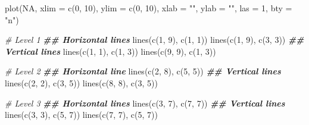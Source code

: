 \documentclass[
]{book}
\newenvironment{Shaded}{\begin{snugshade}}{\end{snugshade}}
\newcommand{\AttributeTok}[1]{\textcolor[rgb]{0.77,0.63,0.00}{#1}}
\newcommand{\CommentTok}[1]{\textcolor[rgb]{0.56,0.35,0.01}{\textit{#1}}}
\newcommand{\ConstantTok}[1]{\textcolor[rgb]{0.00,0.00,0.00}{#1}}
\newcommand{\DecValTok}[1]{\textcolor[rgb]{0.00,0.00,0.81}{#1}}
\newcommand{\DocumentationTok}[1]{\textcolor[rgb]{0.56,0.35,0.01}{\textbf{\textit{#1}}}}
\newcommand{\FunctionTok}[1]{\textcolor[rgb]{0.00,0.00,0.00}{#1}}
\newcommand{\NormalTok}[1]{#1}
\newcommand{\StringTok}[1]{\textcolor[rgb]{0.31,0.60,0.02}{#1}}
\begin{document}
\begin{Shaded}
\begin{Highlighting}[]
\FunctionTok{plot}\NormalTok{(}\ConstantTok{NA}\NormalTok{, }\AttributeTok{xlim =} \FunctionTok{c}\NormalTok{(}\DecValTok{0}\NormalTok{, }\DecValTok{10}\NormalTok{), }\AttributeTok{ylim =} \FunctionTok{c}\NormalTok{(}\DecValTok{0}\NormalTok{, }\DecValTok{10}\NormalTok{), }\AttributeTok{xlab =} \StringTok{""}\NormalTok{, }\AttributeTok{ylab =} \StringTok{""}\NormalTok{, }\AttributeTok{las =} \DecValTok{1}\NormalTok{, }\AttributeTok{bty =} \StringTok{"n"}\NormalTok{)}

\CommentTok{\# Level 1}
\DocumentationTok{\#\# Horizontal lines}
\FunctionTok{lines}\NormalTok{(}\FunctionTok{c}\NormalTok{(}\DecValTok{1}\NormalTok{, }\DecValTok{9}\NormalTok{), }\FunctionTok{c}\NormalTok{(}\DecValTok{1}\NormalTok{, }\DecValTok{1}\NormalTok{))}
\FunctionTok{lines}\NormalTok{(}\FunctionTok{c}\NormalTok{(}\DecValTok{1}\NormalTok{, }\DecValTok{9}\NormalTok{), }\FunctionTok{c}\NormalTok{(}\DecValTok{3}\NormalTok{, }\DecValTok{3}\NormalTok{))}
\DocumentationTok{\#\# Vertical lines}
\FunctionTok{lines}\NormalTok{(}\FunctionTok{c}\NormalTok{(}\DecValTok{1}\NormalTok{, }\DecValTok{1}\NormalTok{), }\FunctionTok{c}\NormalTok{(}\DecValTok{1}\NormalTok{, }\DecValTok{3}\NormalTok{))}
\FunctionTok{lines}\NormalTok{(}\FunctionTok{c}\NormalTok{(}\DecValTok{9}\NormalTok{, }\DecValTok{9}\NormalTok{), }\FunctionTok{c}\NormalTok{(}\DecValTok{1}\NormalTok{, }\DecValTok{3}\NormalTok{))}

\CommentTok{\# Level 2}
\DocumentationTok{\#\# Horizontal line}
\FunctionTok{lines}\NormalTok{(}\FunctionTok{c}\NormalTok{(}\DecValTok{2}\NormalTok{, }\DecValTok{8}\NormalTok{), }\FunctionTok{c}\NormalTok{(}\DecValTok{5}\NormalTok{, }\DecValTok{5}\NormalTok{))}
\DocumentationTok{\#\# Vertical lines}
\FunctionTok{lines}\NormalTok{(}\FunctionTok{c}\NormalTok{(}\DecValTok{2}\NormalTok{, }\DecValTok{2}\NormalTok{), }\FunctionTok{c}\NormalTok{(}\DecValTok{3}\NormalTok{, }\DecValTok{5}\NormalTok{))}
\FunctionTok{lines}\NormalTok{(}\FunctionTok{c}\NormalTok{(}\DecValTok{8}\NormalTok{, }\DecValTok{8}\NormalTok{), }\FunctionTok{c}\NormalTok{(}\DecValTok{3}\NormalTok{, }\DecValTok{5}\NormalTok{))}

\CommentTok{\# Level 3}
\DocumentationTok{\#\# Horizontal lines}
\FunctionTok{lines}\NormalTok{(}\FunctionTok{c}\NormalTok{(}\DecValTok{3}\NormalTok{, }\DecValTok{7}\NormalTok{), }\FunctionTok{c}\NormalTok{(}\DecValTok{7}\NormalTok{, }\DecValTok{7}\NormalTok{))}
\DocumentationTok{\#\# Vertical lines}
\FunctionTok{lines}\NormalTok{(}\FunctionTok{c}\NormalTok{(}\DecValTok{3}\NormalTok{, }\DecValTok{3}\NormalTok{), }\FunctionTok{c}\NormalTok{(}\DecValTok{5}\NormalTok{, }\DecValTok{7}\NormalTok{))}
\FunctionTok{lines}\NormalTok{(}\FunctionTok{c}\NormalTok{(}\DecValTok{7}\NormalTok{, }\DecValTok{7}\NormalTok{), }\FunctionTok{c}\NormalTok{(}\DecValTok{5}\NormalTok{, }\DecValTok{7}\NormalTok{))}


\end{Highlighting}
\end{Shaded}
\end{document}
